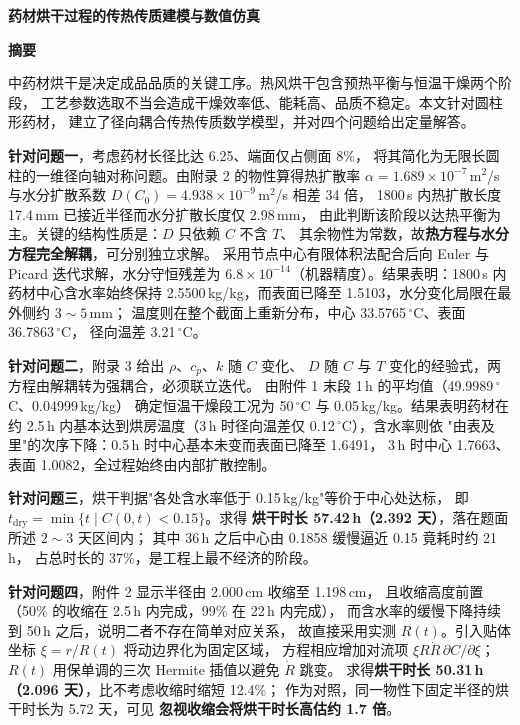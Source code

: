 \documentclass[12pt,a4paper]{ctexart}
\begin{document}
\begin{center}
  {\bfseries 药材烘干过程的传热传质建模与数值仿真}
\end{center}

\vspace{0.5em}
\begin{center}
  {\bfseries 摘\quad 要}
\end{center}

\noindent
中药材烘干是决定成品品质的关键工序。热风烘干包含预热平衡与恒温干燥两个阶段，
工艺参数选取不当会造成干燥效率低、能耗高、品质不稳定。本文针对圆柱形药材，
建立了径向耦合传热传质数学模型，并对四个问题给出定量解答。

\textbf{针对问题一}，考虑药材长径比达 6.25、端面仅占侧面 8\%，
将其简化为无限长圆柱的一维径向轴对称问题。由附录 2 的物性算得热扩散率
$\alpha=1.689\times10^{-7}$\,m$^2$/s 与水分扩散系数
$D(C_0)=4.938\times10^{-9}$\,m$^2$/s 相差 34 倍，
1800\,s 内热扩散长度 17.4\,mm 已接近半径而水分扩散长度仅 2.98\,mm，
由此判断该阶段以达热平衡为主。关键的结构性质是：$D$ 只依赖 $C$ 不含 $T$、
其余物性为常数，故\textbf{热方程与水分方程完全解耦}，可分别独立求解。
采用节点中心有限体积法配合后向 Euler 与 Picard 迭代求解，水分守恒残差为
$6.8\times10^{-14}$（机器精度）。结果表明：1800\,s 内药材中心含水率始终保持
2.5500\,kg/kg，而表面已降至 1.5103，水分变化局限在最外侧约 $3\sim5$\,mm；
温度则在整个截面上重新分布，中心 33.5765\,$^\circ$C、表面 36.7863\,$^\circ$C，
径向温差 3.21\,$^\circ$C。

\textbf{针对问题二}，附录 3 给出 $\rho$、$c_p$、$k$ 随 $C$ 变化、
$D$ 随 $C$ 与 $T$ 变化的经验式，两方程由解耦转为强耦合，必须联立迭代。
由附件 1 末段 1\,h 的平均值（49.9989\,$^\circ$C、0.04999\,kg/kg）
确定恒温干燥段工况为 50\,$^\circ$C 与 0.05\,kg/kg。结果表明药材在约 2.5\,h
内基本达到烘房温度（3\,h 时径向温差仅 0.12\,$^\circ$C），含水率则依
"由表及里"的次序下降：0.5\,h 时中心基本未变而表面已降至 1.6491，
3\,h 时中心 1.7663、表面 1.0082，全过程始终由内部扩散控制。

\textbf{针对问题三}，烘干判据"各处含水率低于 0.15\,kg/kg"等价于中心处达标，
即 $t_{\mathrm{dry}}=\min\{t\mid C(0,t)<0.15\}$。求得
\textbf{烘干时长 57.42\,h（2.392 天）}，落在题面所述 $2\sim3$ 天区间内；
其中 36\,h 之后中心由 0.1858 缓慢逼近 0.15 竟耗时约 21\,h，
占总时长的 37\%，是工程上最不经济的阶段。

\textbf{针对问题四}，附件 2 显示半径由 2.000\,cm 收缩至 1.198\,cm，
且收缩高度前置（50\% 的收缩在 2.5\,h 内完成，99\% 在 22\,h 内完成），
而含水率的缓慢下降持续到 50\,h 之后，说明二者不存在简单对应关系，
故直接采用实测 $R(t)$。引入贴体坐标 $\xi=r/R(t)$ 将动边界化为固定区域，
方程相应增加对流项 $\xi R\dot R\,\partial C/\partial\xi$；
$R(t)$ 用保单调的三次 Hermite 插值以避免 $\dot R$ 跳变。
求得\textbf{烘干时长 50.31\,h（2.096 天）}，比不考虑收缩时缩短 12.4\%；
作为对照，同一物性下固定半径的烘干时长为 5.72 天，可见
\textbf{忽视收缩会将烘干时长高估约 1.7 倍}。
\end{document}
